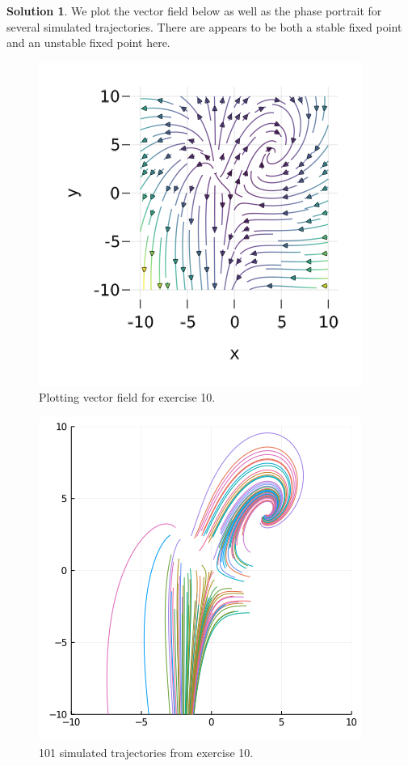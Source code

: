 \documentclass[12pt]{article}
\theoremstyle{definition}
\newtheorem{sol}{Solution}
\theoremstyle{remark}
\begin{document}
\begin{sol}\leavevmode
    We plot the vector field below as well as the phase portrait for several simulated trajectories. There are appears to be both a stable fixed point and an unstable fixed point here. 
 \end{sol}

   \begin{figure}[h]
     \centering
     \includegraphics[width=0.8\linewidth]{figs/hw-1-exer-10.png}
     \caption{Plotting vector field for exercise 10.}%
     \label{fig:exer-10}
 \end{figure}

    \begin{figure}[h]
     \centering
     \includegraphics[width=0.8\linewidth]{figs/hw-1-exer-10-traj.png}
     \caption{101 simulated trajectories from exercise 10.}%
     \label{fig:exer-10-traj}
 \end{figure}

\newpage

\

\newpage
\end{document}
